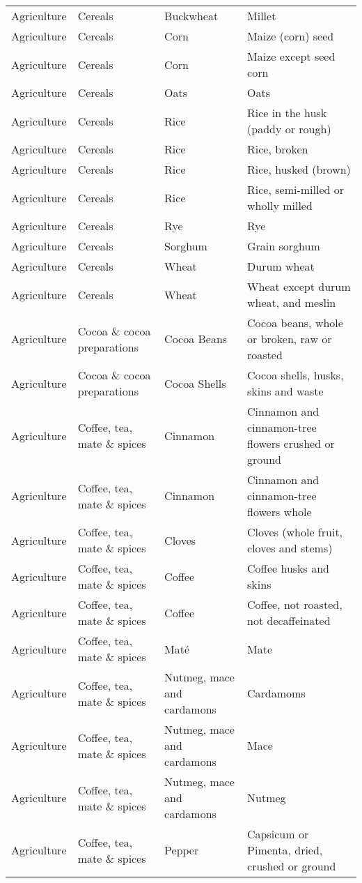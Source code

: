 \begin{appendices}
\begin{xltabular}{\textwidth}{|p{0.07\textwidth}|p{0.28\textwidth}|p{0.24\textwidth}|p{0.31\textwidth}|}
	Agriculture & Cereals & Buckwheat & Millet \\
	Agriculture & Cereals & Corn & Maize (corn) seed \\
	Agriculture & Cereals & Corn & Maize except seed corn \\
	Agriculture & Cereals & Oats & Oats \\
	Agriculture & Cereals & Rice & Rice in the husk (paddy or rough) \\
	Agriculture & Cereals & Rice & Rice, broken \\
	Agriculture & Cereals & Rice & Rice, husked (brown) \\
	Agriculture & Cereals & Rice & Rice, semi-milled or wholly milled \\
	Agriculture & Cereals & Rye & Rye \\
	Agriculture & Cereals & Sorghum & Grain sorghum \\
	Agriculture & Cereals & Wheat & Durum wheat \\
	Agriculture & Cereals & Wheat & Wheat except durum wheat, and meslin \\
	Agriculture & Cocoa \& cocoa preparations & Cocoa Beans & Cocoa beans, whole or broken, raw or roasted \\
	Agriculture & Cocoa \& cocoa preparations & Cocoa Shells & Cocoa shells, husks, skins and waste \\
	Agriculture & Coffee, tea, mate \& spices & Cinnamon & Cinnamon and cinnamon-tree flowers crushed or ground \\
	Agriculture & Coffee, tea, mate \& spices & Cinnamon & Cinnamon and cinnamon-tree flowers whole \\
	Agriculture & Coffee, tea, mate \& spices & Cloves & Cloves (whole fruit, cloves and stems) \\
	Agriculture & Coffee, tea, mate \& spices & Coffee & Coffee husks and skins \\
	Agriculture & Coffee, tea, mate \& spices & Coffee & Coffee, not roasted, not decaffeinated \\
	Agriculture & Coffee, tea, mate \& spices & Maté & Mate \\
	Agriculture & Coffee, tea, mate \& spices & Nutmeg, mace and cardamons & Cardamoms \\
	Agriculture & Coffee, tea, mate \& spices & Nutmeg, mace and cardamons & Mace \\
	Agriculture & Coffee, tea, mate \& spices & Nutmeg, mace and cardamons & Nutmeg \\
	Agriculture & Coffee, tea, mate \& spices & Pepper & Capsicum or Pimenta, dried, crushed or ground \\

\end{xltabular}
\end{appendices}
